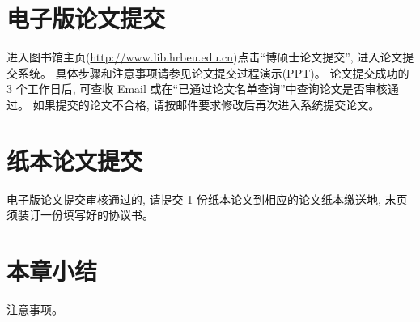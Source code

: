 \section{电子版论文提交}

    进入图书馆主页(\url{http://www.lib.hrbeu.edu.cn})点击“博硕士论文提交”, 进入论文提交系统。
    具体步骤和注意事项请参见论文提交过程演示(PPT)。
    论文提交成功的 3 个工作日后, 可查收 Email 或在“已通过论文名单查询”中查询论文是否审核通过。
    如果提交的论文不合格, 请按邮件要求修改后再次进入系统提交论文。

\section{纸本论文提交}

    电子版论文提交审核通过的, 请提交 1 份纸本论文到相应的论文纸本缴送地,
    末页须装订一份填写好的协议书。

\section*{本章小结}
注意事项。